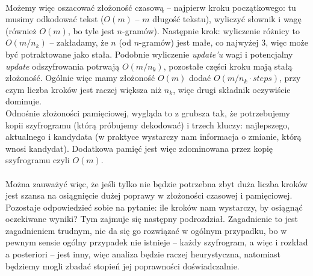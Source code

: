 \documentclass[a4paper]{article}
\theoremstyle{defn}
\theoremstyle{theorem}
\theoremstyle{lemma}
\theoremstyle{cor}
\theoremstyle{fact}
\begin{document}
\\
Możemy więc oszacować złożoność czasową – najpierw kroku początkowego: tu musimy odkodować tekst ($O(m)$ – $m$ długość tekstu), wyliczyć słownik i wagę (również  $O(m)$, bo tyle jest $n$-gramów). Następnie krok: wyliczenie różnicy to $O(m/n_k)$ – zakładamy, że $n$ (od $n$-gramów) jest małe, co najwyżej 3, więc może być potraktowane jako stała. Podobnie wyliczenie \textit{update'u} wagi i potencjalny \textit{update} odszyfrowania potrwają $O(m/n_k)$, pozostałe części kroku mają stałą złożoność. Ogólnie więc mamy złożoność $O(m)$ dodać $O(m/n_k \cdot steps)$, przy czym liczba kroków jest raczej większa niż $n_k$, więc drugi składnik oczywiście dominuje.\\
Odnośnie złożoności pamięciowej, wygląda to z grubsza tak, że potrzebujemy kopii szyfrogramu (którą próbujemy dekodować) i trzech kluczy: najlepszego, aktualnego i kandydata (w praktyce wystarczy nam informacja o zmianie, którą wnosi kandydat). Dodatkowa pamięć jest więc zdominowana przez kopię szyfrogramu czyli $O(m)$.\\\\
Można zauważyć więc, że jeśli tylko nie będzie potrzebna zbyt duża liczba kroków jest szansa na osiągnięcie dużej poprawy w złożoności czasowej i pamięciowej. Pozostaje odpowiedzieć sobie na pytanie: ile kroków nam wystarczy, by osiągnąć oczekiwane wyniki? Tym zajmuje się następny podrozdział. Zagadnienie to jest zagadnieniem trudnym, nie da się go rozwiązać w ogólnym przypadku, bo w pewnym sensie ogólny przypadek nie istnieje – każdy szyfrogram, a więc i rozkład a posteriori – jest inny, więc analiza będzie raczej heurystyczna, natomiast będziemy mogli zbadać stopień jej poprawności doświadczalnie.
\end{document}
